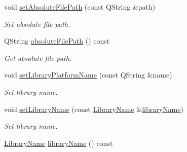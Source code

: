 \begin{DoxyCompactItemize}
\item 
void \hyperlink{class_mdt_1_1_deploy_utils_1_1_qt_plugin_info_a449c1830d608a23d4cc3572585676e59}{set\+Absolute\+File\+Path} (const Q\+String \&path)\hypertarget{class_mdt_1_1_deploy_utils_1_1_qt_plugin_info_a449c1830d608a23d4cc3572585676e59}{}\label{class_mdt_1_1_deploy_utils_1_1_qt_plugin_info_a449c1830d608a23d4cc3572585676e59}

\begin{DoxyCompactList}\small\item\em Set absolute file path. \end{DoxyCompactList}\item 
Q\+String \hyperlink{class_mdt_1_1_deploy_utils_1_1_qt_plugin_info_adf93dc7347e848b9e80b9989c2ed00e0}{absolute\+File\+Path} () const \hypertarget{class_mdt_1_1_deploy_utils_1_1_qt_plugin_info_adf93dc7347e848b9e80b9989c2ed00e0}{}\label{class_mdt_1_1_deploy_utils_1_1_qt_plugin_info_adf93dc7347e848b9e80b9989c2ed00e0}

\begin{DoxyCompactList}\small\item\em Get absolute file path. \end{DoxyCompactList}\item 
void \hyperlink{class_mdt_1_1_deploy_utils_1_1_qt_plugin_info_ab1d88fa78b5dfcd77de2a3c838314bb8}{set\+Library\+Platform\+Name} (const Q\+String \&name)
\begin{DoxyCompactList}\small\item\em Set library name. \end{DoxyCompactList}\item 
void \hyperlink{class_mdt_1_1_deploy_utils_1_1_qt_plugin_info_a957517df8c3a28acc4aea1b941ae00cf}{set\+Library\+Name} (const \hyperlink{class_mdt_1_1_deploy_utils_1_1_library_name}{Library\+Name} \&\hyperlink{class_mdt_1_1_deploy_utils_1_1_qt_plugin_info_aabcab7f5fe75778a27baf5e918adc491}{library\+Name})
\begin{DoxyCompactList}\small\item\em Set library name. \end{DoxyCompactList}\item 
\hyperlink{class_mdt_1_1_deploy_utils_1_1_library_name}{Library\+Name} \hyperlink{class_mdt_1_1_deploy_utils_1_1_qt_plugin_info_aabcab7f5fe75778a27baf5e918adc491}{library\+Name} () const \hypertarget{class_mdt_1_1_deploy_utils_1_1_qt_plugin_info_aabcab7f5fe75778a27baf5e918adc491}{}\label{class_mdt_1_1_deploy_utils_1_1_qt_plugin_info_aabcab7f5fe75778a27baf5e918adc491}


\end{DoxyCompactItemize}
